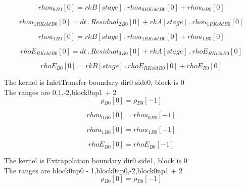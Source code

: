 \documentclass{article}
\begin{document}
\begin{dmath}{rhou_{0}{_{B0}}}[{0}] = {rkB}[{stage}] \,.\, {rhou_{0 RKold}{_{B0}}}[{0}] + {rhou_{0}{_{B0}}}[{0}]\end{dmath}

\begin{dmath}{rhou_{1 RKold}{_{B0}}}[{0}] = dt \,.\, {Residual_{2}{_{B0}}}[{0}] + {rkA}[{stage}] \,.\, {rhou_{1 RKold}{_{B0}}}[{0}]\end{dmath}

\begin{dmath}{rhou_{1}{_{B0}}}[{0}] = {rkB}[{stage}] \,.\, {rhou_{1 RKold}{_{B0}}}[{0}] + {rhou_{1}{_{B0}}}[{0}]\end{dmath}

\begin{dmath}{rhoE_{RKold}{_{B0}}}[{0}] = dt \,.\, {Residual_{3}{_{B0}}}[{0}] + {rkA}[{stage}] \,.\, {rhoE_{RKold}{_{B0}}}[{0}]\end{dmath}

\begin{dmath}{rhoE{_{B0}}}[{0}] = {rkB}[{stage}] \,.\, {rhoE_{RKold}{_{B0}}}[{0}] + {rhoE{_{B0}}}[{0}]\end{dmath}

\noindent The kernel is InletTransfer boundary dir0 side0, block is 0\\\noindent The ranges are 0,1,-2,block0np1 + 2\\\begin{dmath}{\rho{_{B0}}}[{0}] = {\rho{_{B0}}}[{-1}]\end{dmath}

\begin{dmath}{rhou_{0}{_{B0}}}[{0}] = {rhou_{0}{_{B0}}}[{-1}]\end{dmath}

\begin{dmath}{rhou_{1}{_{B0}}}[{0}] = {rhou_{1}{_{B0}}}[{-1}]\end{dmath}

\begin{dmath}{rhoE{_{B0}}}[{0}] = {rhoE{_{B0}}}[{-1}]\end{dmath}

\noindent The kernel is Extrapolation boundary dir0 side1, block is 0\\\noindent The ranges are block0np0 - 1,block0np0,-2,block0np1 + 2\\\begin{dmath}{\rho{_{B0}}}[{0}] = {\rho{_{B0}}}[{-1}]\end{dmath}
\end{document}
